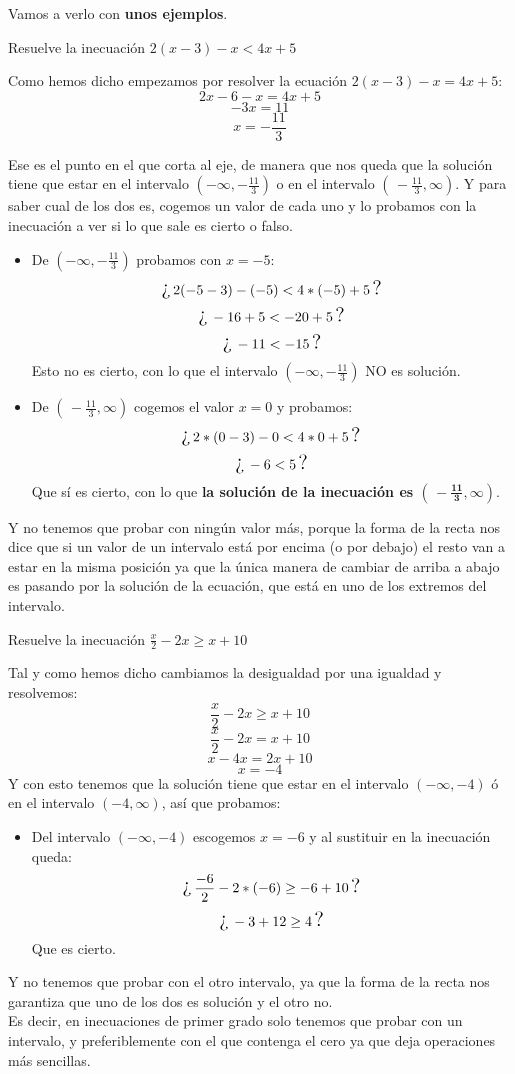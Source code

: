 \documentclass[a4paper,11pt,answers]{exam}
\newcommand{\testineq}[1]{\[\text{\Large{¿}}\,#1\,\text{\Large{?}}\]}
\begin{document}
Vamos a verlo con \textbf{unos ejemplos}.
\begin{questions}
\question Resuelve la inecuación $2(x-3) - x< 4x + 5$
  \begin{solution}
    Como hemos dicho empezamos por resolver la ecuación $2(x-3) -x = 4x + 5$:
    \[2x - 6 - x = 4x +5\]
    \[-3x = 11\]
    \[x = -\frac{11}{3}\]

    Ese es el punto en el que corta al eje, de manera que nos queda que la solución tiene que
    estar en el intervalo $\left(-\infty, -\frac{11}{3}\right)$ o en el intervalo
    $\left(\,-\frac{11}{3}, \infty\right)$. Y para saber cual de los dos es, cogemos un valor
    de cada uno y lo probamos con la inecuación a ver si lo que sale es cierto o falso.
    \begin{itemize}
    \item De $\left(-\infty, -\frac{11}{3}\right)$ probamos con $x = -5$:
      \testineq{2(-5-3) - (-5) < 4*(-5) + 5}
      \testineq{-16 + 5 < -20 + 5}
      \testineq{-11 < -15}
      Esto no es cierto, con lo que el intervalo $\left(-\infty, -\frac{11}{3}\right)$ NO es
      solución.
    \item De $\left(\,-\frac{11}{3}, \infty\right)$ cogemos el valor $x =0$ y probamos:
      \testineq{2*(0-3) - 0 < 4*0 + 5}
      \testineq{-6 < 5}
      Que sí es cierto, con lo que \textbf{la solución de la inecuación es
        $\boldsymbol{\left(\,-\frac{11}{3}, \infty\right)}$}.
    \end{itemize}
    Y no tenemos que probar con ningún valor más, porque la forma de la recta nos dice que si
    un valor de un intervalo está por encima (o por debajo) el resto van a estar en la misma
    posición ya que la única manera de cambiar de arriba a abajo es pasando por la solución de
    la ecuación, que está en uno de los extremos del intervalo.
  \end{solution}
\question Resuelve la inecuación $\frac{x}{2} - 2x \geq x+10$
  \begin{solution}
    Tal y como hemos dicho cambiamos la desigualdad por una igualdad y resolvemos:
    \[\frac{x}{2} - 2x \geq x+10\]
    \[\frac{x}{2} - 2x = x+10\]
    \[x - 4x = 2x + 10\]
    \[x = -4\]
    Y con esto tenemos que la solución tiene que estar en el intervalo $(-\infty, -4)$ ó en el
    intervalo $(-4, \infty)$, así que probamos:
    \begin{itemize}
    \item Del intervalo $(-\infty, -4)$ escogemos $x = -6$ y al sustituir en la inecuación queda:
      \testineq{\frac{-6}{2} - 2*(-6) \geq -6 + 10}
      \testineq{-3 + 12 \geq 4}
      Que es cierto.
    \end{itemize}
    Y no tenemos que probar con el otro intervalo, ya que la forma de la recta nos garantiza que
    uno de los dos es solución y el otro no.\\
    Es decir, en inecuaciones de primer grado solo tenemos que probar con un intervalo,
    y preferiblemente con el que contenga el cero ya que deja operaciones más sencillas.\\


\end{solution}
\end{questions}
\end{document}
